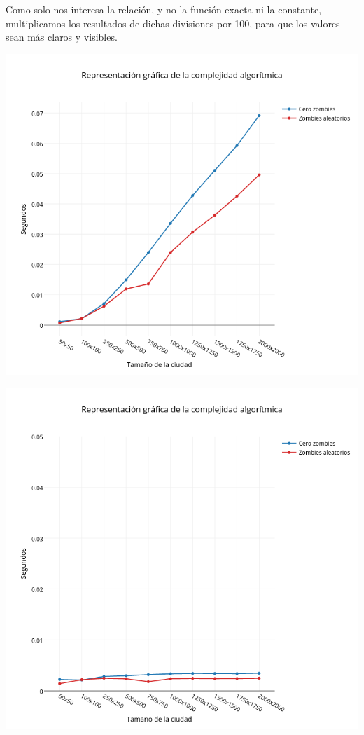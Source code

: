 Como solo nos interesa la relación, y no la función exacta ni la constante, multiplicamos los resultados de dichas divisiones por 100, para que los valores sean más claros y visibles.

\includegraphics[width=15cm,keepaspectratio=yes]{imagenes/ej2/linealizacion.png}

\includegraphics[width=15cm,keepaspectratio=yes]{imagenes/ej2/constantizacion.png}

